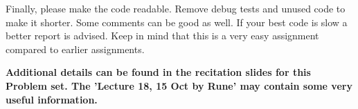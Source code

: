 \documentclass[10pt,a4paper]{article}
\begin{document}
\begin{enumerate}[a)]
\begin{comment}
\item Somehow optimize/reimplement the code \emph {with} CUDA. You may use the original problem set 3 code as basis or the new 'CMB winner' code. Our hope is that you will get better performance than the CPU version (this is possible but untested). This is your only program code delivery.
\begin{itemize}
	\item Deciding what each thread is supposed to solve is the key challenge. The 'CMB winner' code probably do not map well to '1 thread = 1 pixel'. However, in the original PS3 code this was the case. You must find a balance between the serial reuse of values and brute force.
	\item The code must run on its-015-XX.idi.ntnu.no (XX being any of the lab machines in ITS015). You must report the time the program uses. If you use your own system report CPU+GPU specifications and the compiler. Just using the \texttt{time} command is acceptable.

\item In your report answer these questions:
\begin{enumerate}[i)]
	\item  State what version you used as basis for your hand-in.
	\item  Write a short list of what changes/optimizations you have performed. Details are not needed, unless you have done something very smart.
	\item  Write some comments on the difference between your problem set 3 code and the 'CMB winner' code.
	\item  What do you think is the current bottleneck in your CUDA code?
\end{enumerate}
\end{itemize}
\end{comment}





\end{enumerate}

Finally, please make the code readable. Remove debug tests and unused code to make it shorter. Some comments can be good as well. If your best code is slow a better report is advised. Keep in mind that this is a very easy assignment compared to earlier assignments.


\vspace{\baselineskip}
\textbf{Additional details can be found in the recitation slides for this Problem set.
The 'Lecture 18, 15 Oct by Rune' may contain some very useful information.}
\end{document}
